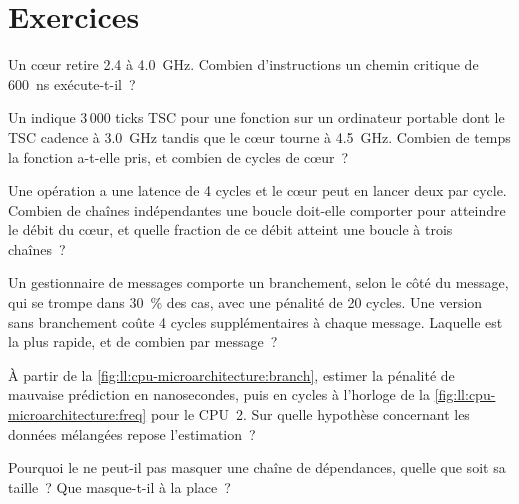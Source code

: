 \section{Exercices}

\begin{exercise}[$\star$]\label{exo:ll:cpu-microarchitecture:1}
Un cœur retire 2.4  à 4.0~GHz. Combien d'instructions un chemin critique de \qty{600}{\nano\second}
exécute-t-il~?
\end{exercise}

\begin{exercise}[$\star$]\label{exo:ll:cpu-microarchitecture:2}
Un  indique 3\,000 ticks TSC pour une fonction sur un ordinateur portable dont le TSC cadence à 3.0~GHz tandis que le cœur tourne à
4.5~GHz. Combien de temps la fonction a-t-elle pris, et combien de cycles de cœur~?
\end{exercise}

\begin{exercise}[$\star$]\label{exo:ll:cpu-microarchitecture:3}
Une opération a une latence de 4 cycles et le cœur peut en lancer deux par cycle. Combien de chaînes indépendantes une boucle
doit-elle comporter pour atteindre le débit du cœur, et quelle fraction de ce débit atteint une boucle à trois chaînes~?
\end{exercise}

\begin{exercise}[$\star\star$]\label{exo:ll:cpu-microarchitecture:4}
Un gestionnaire de messages comporte un branchement, selon le côté du message, qui se trompe dans 30~\% des cas, avec une pénalité de 20 cycles. Une
version sans branchement coûte 4 cycles supplémentaires à chaque message. Laquelle est la plus rapide, et de combien par message~?
\end{exercise}

\begin{exercise}[$\star\star$]\label{exo:ll:cpu-microarchitecture:5}
À partir de la \cref{fig:ll:cpu-microarchitecture:branch}, estimer la pénalité de mauvaise prédiction en nanosecondes, puis en cycles à
l'horloge de la \cref{fig:ll:cpu-microarchitecture:freq} pour le CPU~2. Sur quelle hypothèse concernant les données mélangées repose
l'estimation~?
\end{exercise}

\begin{exercise}[$\star\star$]\label{exo:ll:cpu-microarchitecture:6}
Pourquoi le  ne peut-il pas masquer une chaîne de dépendances, quelle que soit sa taille~? Que masque-t-il à la place~?
\end{exercise}

